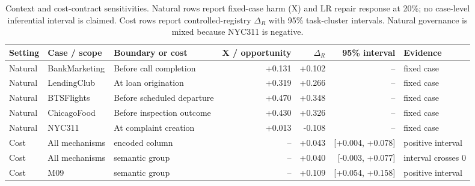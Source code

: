 \begin{table}[t]
\caption{Context and cost-contract sensitivities. Natural rows report fixed-case harm (X) and LR repair response at 20\%; no case-level inferential interval is claimed. Cost rows report controlled-registry $\Delta_R$ with 95\% task-cluster intervals. Natural governance is mixed because NYC311 is negative.}
\label{tab:natural}
\centering\small
\begin{tabular}{lllrrrl}
\toprule
Setting & Case / scope & Boundary or cost & X / opportunity & $\Delta_R$ & 95\% interval & Evidence \\
\midrule
Natural & BankMarketing & Before call completion & +0.131 & +0.102 & -- & fixed case \\
Natural & LendingClub & At loan origination & +0.319 & +0.266 & -- & fixed case \\
Natural & BTSFlights & Before scheduled departure & +0.470 & +0.348 & -- & fixed case \\
Natural & ChicagoFood & Before inspection outcome & +0.430 & +0.326 & -- & fixed case \\
Natural & NYC311 & At complaint creation & +0.013 & -0.108 & -- & fixed case \\
\midrule
Cost & All mechanisms & encoded column & -- & +0.043 & [+0.004, +0.078] & positive interval \\
Cost & All mechanisms & semantic group & -- & +0.040 & [-0.003, +0.077] & interval crosses 0 \\
Cost & M09 & semantic group & -- & +0.109 & [+0.054, +0.158] & positive interval \\
\bottomrule
\end{tabular}
\end{table}
